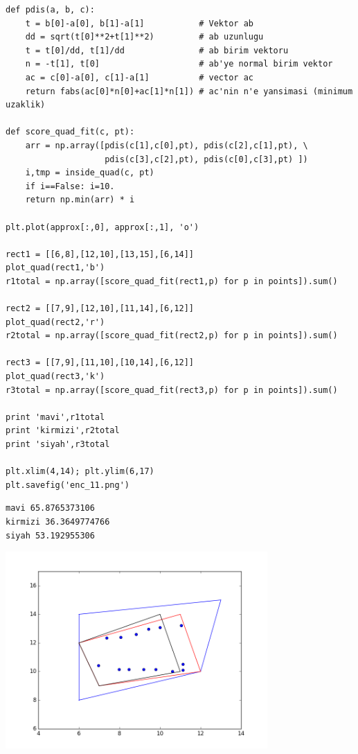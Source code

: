 \documentclass[12pt,fleqn]{article}\usepackage{../../common}
\begin{document}
\begin{verbatim}
def pdis(a, b, c):
    t = b[0]-a[0], b[1]-a[1]           # Vektor ab
    dd = sqrt(t[0]**2+t[1]**2)         # ab uzunlugu
    t = t[0]/dd, t[1]/dd               # ab birim vektoru
    n = -t[1], t[0]                    # ab'ye normal birim vektor
    ac = c[0]-a[0], c[1]-a[1]          # vector ac
    return fabs(ac[0]*n[0]+ac[1]*n[1]) # ac'nin n'e yansimasi (minimum uzaklik)

def score_quad_fit(c, pt):
    arr = np.array([pdis(c[1],c[0],pt), pdis(c[2],c[1],pt), \
                    pdis(c[3],c[2],pt), pdis(c[0],c[3],pt) ])
    i,tmp = inside_quad(c, pt)
    if i==False: i=10.
    return np.min(arr) * i

plt.plot(approx[:,0], approx[:,1], 'o')

rect1 = [[6,8],[12,10],[13,15],[6,14]]
plot_quad(rect1,'b')
r1total = np.array([score_quad_fit(rect1,p) for p in points]).sum()

rect2 = [[7,9],[12,10],[11,14],[6,12]]
plot_quad(rect2,'r')
r2total = np.array([score_quad_fit(rect2,p) for p in points]).sum()

rect3 = [[7,9],[11,10],[10,14],[6,12]]
plot_quad(rect3,'k')
r3total = np.array([score_quad_fit(rect3,p) for p in points]).sum()

print 'mavi',r1total
print 'kirmizi',r2total
print 'siyah',r3total

plt.xlim(4,14); plt.ylim(6,17)
plt.savefig('enc_11.png')
\end{verbatim}

\begin{verbatim}
mavi 65.8765373106
kirmizi 36.3649774766
siyah 53.192955306
\end{verbatim}

\includegraphics[width=10cm]{enc_11.png}
\end{document}
